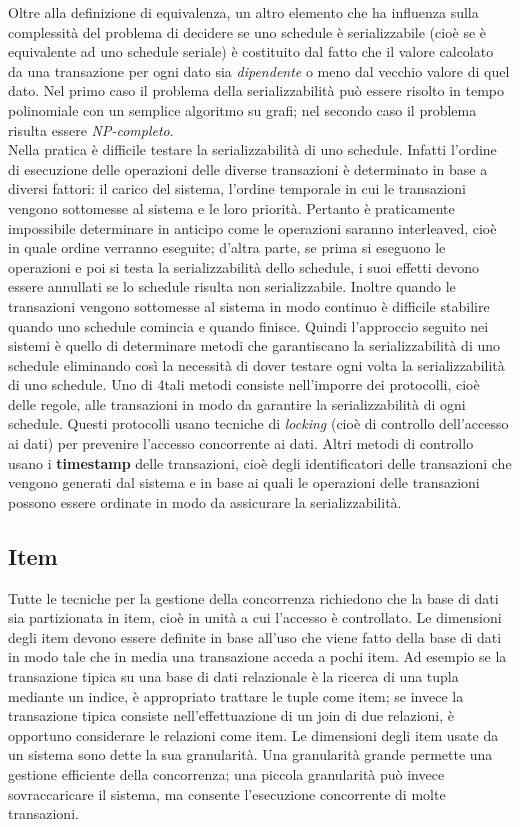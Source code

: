 Oltre alla definizione di equivalenza, un altro elemento che ha influenza sulla complessità del
problema di decidere se uno schedule è serializzabile (cioè se è equivalente ad uno schedule seriale)
è costituito dal fatto che il valore calcolato da una transazione per ogni dato sia \emph{dipendente} o meno
dal vecchio valore di quel dato. Nel primo caso il problema della serializzabilità può essere risolto
in tempo polinomiale con un semplice algoritmo su grafi; nel secondo caso il problema risulta
essere \emph{NP-completo}.\\
Nella pratica è difficile testare la serializzabilità di uno schedule. Infatti l'ordine di esecuzione delle
operazioni delle diverse transazioni è determinato in base a diversi fattori: il carico del sistema,
l'ordine temporale in cui le transazioni vengono sottomesse al sistema e le loro priorità. Pertanto è
praticamente impossibile determinare in anticipo come le operazioni saranno interleaved, cioè in
quale ordine verranno eseguite; d'altra parte, se prima si eseguono le operazioni e poi si testa la
serializzabilità dello schedule, i suoi effetti devono essere annullati se lo schedule risulta non
serializzabile. Inoltre quando le transazioni vengono sottomesse al sistema in modo continuo è
difficile stabilire quando uno schedule comincia e quando finisce. Quindi l'approccio seguito nei
sistemi è quello di determinare metodi che garantiscano la serializzabilità di uno schedule
eliminando così la necessità di dover testare ogni volta la serializzabilità di uno schedule. Uno di
4tali metodi consiste nell'imporre dei protocolli, cioè delle regole, alle transazioni in modo da
garantire la serializzabilità di ogni schedule. Questi protocolli usano tecniche di \emph{locking} (cioè di
controllo dell'accesso ai dati) per prevenire l'accesso concorrente ai dati. Altri metodi di controllo
usano i \textbf{timestamp} delle transazioni, cioè degli identificatori delle transazioni che vengono generati
dal sistema e in base ai quali le operazioni delle transazioni possono essere ordinate in modo da
assicurare la serializzabilità.

\subsection{Item}
Tutte le tecniche per la gestione della concorrenza richiedono che la base di dati sia partizionata in
item, cioè in unità a cui l’accesso è controllato. Le dimensioni degli item devono essere definite in
base all’uso che viene fatto della base di dati in modo tale che in media una transazione acceda a
pochi item. Ad esempio se la transazione tipica su una base di dati relazionale è la ricerca di una
tupla mediante un indice, è appropriato trattare le tuple come item; se invece la transazione tipica
consiste nell’effettuazione di un join di due relazioni, è opportuno considerare le relazioni come
item. Le dimensioni degli item usate da un sistema sono dette la sua granularità. Una granularità
grande permette una gestione efficiente della concorrenza; una piccola granularità può invece
sovraccaricare il sistema, ma consente l’esecuzione concorrente di molte transazioni.

